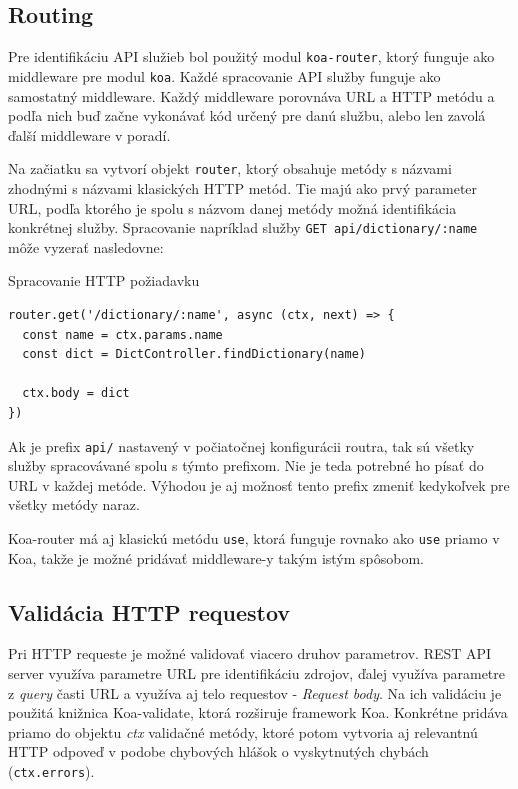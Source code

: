 \documentclass[
  digital, %
  table,   %
  lof,     %
  lot,     %
]{fithesis3}
\begin{document}
\subsection{Routing}
Pre identifikáciu API služieb bol použitý modul \texttt{koa-router}, ktorý funguje ako middleware pre modul \texttt{koa}. Každé spracovanie API služby funguje ako samostatný middleware. Každý middleware porovnáva URL a HTTP metódu a podľa nich buď začne vykonávať kód určený pre danú službu, alebo len zavolá ďalší middleware v poradí.

Na začiatku sa vytvorí objekt \texttt{router}, ktorý obsahuje metódy s názvami zhodnými s názvami klasických HTTP metód. Tie majú ako prvý parameter URL, podľa ktorého je spolu s názvom danej metódy možná identifikácia konkrétnej služby. Spracovanie napríklad služby \texttt{GET api/dictionary/:name} môže vyzerať nasledovne:

\begin{exmp}
Spracovanie HTTP požiadavku
\centering
\begin{lstlisting}[basicstyle=\small]
router.get('/dictionary/:name', async (ctx, next) => {
  const name = ctx.params.name
  const dict = DictController.findDictionary(name)
  
  ctx.body = dict
})
\end{lstlisting}
\end{exmp}

Ak je prefix \texttt{api/} nastavený v počiatočnej konfigurácii routra, tak sú všetky služby spracovávané spolu s týmto prefixom. Nie je teda potrebné ho písať do URL v každej metóde. Výhodou je aj možnosť tento prefix zmeniť kedykoľvek pre všetky metódy naraz.

Koa-router má aj klasickú metódu \texttt{use}, ktorá funguje rovnako ako \texttt{use} priamo v Koa, takže je možné pridávať middleware-y takým istým spôsobom.

\subsection{Validácia HTTP requestov}
Pri HTTP requeste je možné validovať viacero druhov parametrov. REST API server využíva parametre URL pre identifikáciu zdrojov, ďalej využíva parametre z \textit{query} časti URL a využíva aj telo requestov - \textit{Request body}. Na ich validáciu je použitá knižnica Koa-validate, ktorá rozširuje framework Koa. Konkrétne pridáva priamo do objektu \textit{ctx} validačné metódy, ktoré potom vytvoria aj relevantnú HTTP odpoveď v podobe chybových hlášok o vyskytnutých chybách (\texttt{ctx.errors}).
\end{document}
